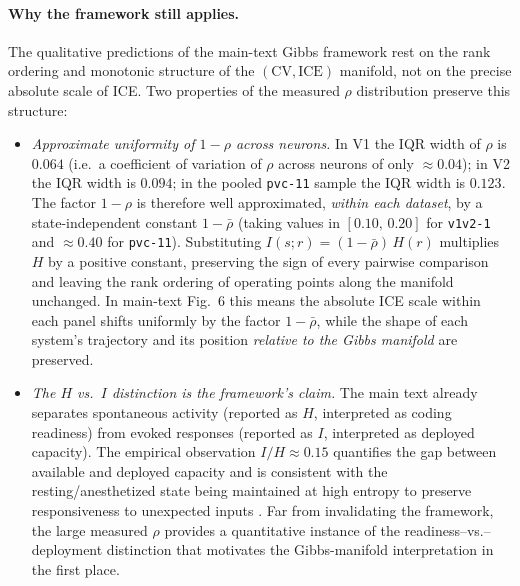\documentclass[11pt]{article}
\theoremstyle{remark}
\theoremstyle{definition}
\begin{document}
\paragraph{Why the framework still applies.}
The qualitative predictions of the main-text Gibbs framework rest on the rank ordering and monotonic structure of the $(\mathrm{CV},\mathrm{ICE})$ manifold, not on the precise absolute scale of ICE.  Two properties of the measured $\rho$ distribution preserve this structure:
\begin{itemize}
  \item \emph{Approximate uniformity of $1-\rho$ across neurons.}  In V1 the IQR width of $\rho$ is $0.064$ (i.e.\ a coefficient of variation of $\rho$ across neurons of only $\approx 0.04$); in V2 the IQR width is $0.094$; in the pooled \texttt{pvc-11} sample the IQR width is $0.123$.  The factor $1-\rho$ is therefore well approximated, \emph{within each dataset}, by a state-independent constant $1-\bar\rho$ (taking values in $[0.10,\,0.20]$ for \texttt{v1v2-1} and $\approx 0.40$ for \texttt{pvc-11}).  Substituting $I(s;r) = (1-\bar\rho)\,H(r)$ multiplies $H$ by a positive constant, preserving the sign of every pairwise comparison and leaving the rank ordering of operating points along the manifold unchanged.  In main-text Fig.~6 this means the absolute ICE scale within each panel shifts uniformly by the factor $1-\bar\rho$, while the shape of each system's trajectory and its position \emph{relative to the Gibbs manifold} are preserved.
  \item \emph{The $H$ vs.\ $I$ distinction is the framework's claim.}  The main text already separates spontaneous activity (reported as $H$, interpreted as coding readiness) from evoked responses (reported as $I$, interpreted as deployed capacity).  The empirical observation $I/H \approx 0.15$ quantifies the gap between available and deployed capacity and is consistent with the resting/anesthetized state being maintained at high entropy to preserve responsiveness to unexpected inputs \cite{Raichle2001}.  Far from invalidating the framework, the large measured $\rho$ provides a quantitative instance of the readiness--vs.--deployment distinction that motivates the Gibbs-manifold interpretation in the first place.
\end{itemize}
\end{document}
